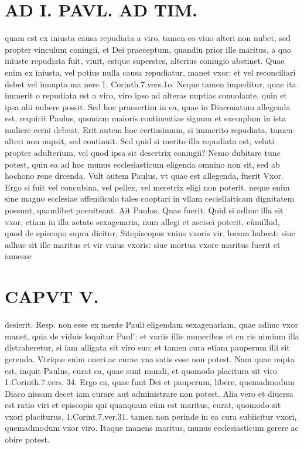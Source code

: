 \documentclass{article}
\begin{document}
\begin{pages}
\section*{AD I. PAVL. AD TIM. }
\marginpar{[ p.276 ]}\pstart quam est ex iniusta causa repudiata a viro, tamen eo viuo alteri non nubet, sed propter vinculum coniugii, et Dei praeceptum, quandiu prior ille maritus, a quo iniuste repudiata fuit, viuit, estque superstes, alterius coniugio abstinet. Quae enim ex iniusta, vel potius nulla causa repudiatur, manet vxor: et vel reconciliari debet vel innupta ma nere 1. Corinth.7.vers.1o. Neque tamen impeditur, quae ita immerit o repudiata est a viro, viro ipso ad alteras nuptias conuolante, quin et ipsa alii nubere possit. Sed hoc praesertim in ea, quae in Diaconatum allegenda est, requirit Paulus, quoniam maioris continentiae signum et exemplum in ista muliere cerni debeat. Erit autem hoc certissimum, si immerito repudiata, tamen alteri non nupsit, sed continuit. Sed quid si merito illa repudiata est, veluti propter adulterium, vel quod ipsa sit desertrix coniugii? Nemo dubitare tunc potest, quin ea ad hoc munus ecclesiasticum eligenda omnino non sit, sed ab hochono rene drcenda.  \pend\pstart Vult autem Paulus, vt quae est allegenda, fuerit Vxor. Ergo si fuit vel concubina, vel pellex, vel meretrix eligi non poterit. neque enim sine magno ecclesiae offendiculo tales cooptari in vllam ceciellaiticam dignitatem possunt, quamlibet poeniteant.  \pend\pstart Ait Paulus. Quae fuerit. Quid si adhuc illa sit vxor, etiam in illa aetate sexagenaria, num allegi et ascisci poterit, cùmillud, quod de episcopo supra dicitur, Sitepiscopus vnius vxoris vir, locum habeat: siue adhuc sit ille maritus et vir vnius vxoris: siue mortua vxore maritus fuerit et iamesse  \pend
\section*{CAPVT  V. }
\marginpar{[ p.277 ]}\pstart desierit. Resp. non esse ex mente Pauli eligendam sexagenariam, quae adhuc vxor manet, quia de viduis loquitur Paul': et variis illis muneribus et cu ris nimium illa distraheretur, si iam alligata sit viro suo: et tamen cura etiam pauperum illi sit gerenda. Vtrique enim oneri ac curae vna satis esse non potest. Nam quae nupta est, inquit Paulus, curat ea, quae sunt mundi, et quomodo placitura sit viro 1.Corinth.7.vers. 34. Ergo ea, quae funt Dei et pauperum, libere, quemadmodum Diaco nissam decet iam curare aut administrare non potest. Alia vero et diuersa est ratio viri et episcopis qui quanquam cùm est maritus, curat, quomodo sit vxori placiturus. 1.Corint.7.ver.31. tamen non perinde in ea cura subiicitur vxori, quemadmodum vxor viro. Itaque manens maritus, munus ecclesiasticum gerere ac obire potest.  \pend
{}
{}

\end{pages}
\end{document}
